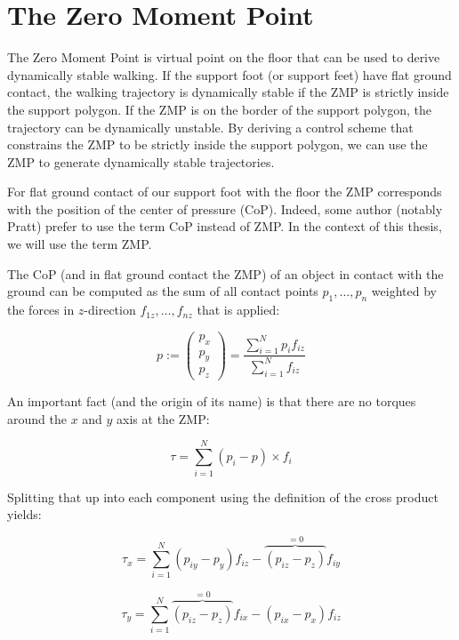 \documentclass[english,ngerman]{KITreprt}
\begin{document}
\section{The Zero Moment Point}\label{the-zero-moment-point}

The Zero Moment Point is virtual point on the floor that can be used to
derive dynamically stable walking. If the support foot (or support feet)
have flat ground contact, the walking trajectory is dynamically stable
if the ZMP is strictly inside the support polygon. If the ZMP is on the
border of the support polygon, the trajectory can be dynamically
unstable. By deriving a control scheme that constrains the ZMP to be
strictly inside the support polygon, we can use the ZMP to generate
dynamically stable trajectories.

For flat ground contact of our support foot with the floor the ZMP
corresponds with the position of the center of pressure (CoP). Indeed,
some author (notably Pratt) prefer to use the term CoP instead of ZMP.
In the context of this thesis, we will use the term ZMP.

The CoP (and in flat ground contact the ZMP) of an object in contact
with the ground can be computed as the sum of all contact points
$p_1, \dots, p_n$ weighted by the forces in $z$-direction
$f_{1z}, \dots, f_{nz}$ that is applied:

\begin{equation} \label{eq:zmp-definition}
p := \left(\begin{array}{c}
p_x \\ p_y \\ p_z
\end{array}\right)
   = \frac{\sum^N_{i=1}p_i f_{iz}}{\sum^N_{i=1} f_{iz}}
\end{equation}

An important fact (and the origin of its name) is that there are no
torques around the $x$ and $y$ axis at the ZMP:

\begin{equation}
\tau = \sum^N_{i=1} (p_i - p) \times f_i
\end{equation}

Splitting that up into each component using the definition of the cross
product yields:

\begin{equation}
\tau_x = \sum^N_{i=1} (p_{iy} - p_y) f_{iz} - \overbrace{(p_{iz} - p_z)}^{=0} f_{iy}
\end{equation}

\begin{equation}
\tau_y = \sum^N_{i=1} \overbrace{(p_{iz} - p_z)}^{=0} f_{ix} - (p_{ix} - p_x) f_{iz}
\end{equation}
\end{document}

